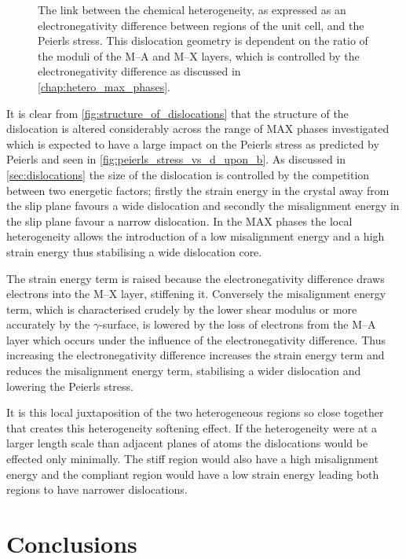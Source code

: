 \begin{figure}
\caption[The link between the structure of dislocations and local heterogeneity.]{The link between the chemical heterogeneity, as expressed as an electronegativity difference between regions of the unit cell, and the Peierls stress. This dislocation geometry is dependent on the ratio of the moduli of the M--A and M--X layers, which is controlled by the electronegativity difference as discussed in \autoref{chap:hetero_max_phases}. \label{fig:structure_of_dislocations}}
\end{figure}


It is clear from \autoref{fig:structure_of_dislocations} that the structure of the dislocation is altered considerably across the range of MAX phases investigated which is expected to have a large impact on the Peierls stress as predicted by Peierls and seen in \autoref{fig:peierls_stress_vs_d_upon_b}. As discussed in \autoref{sec:dislocations} the size of the dislocation is controlled by the competition between two energetic factors; firstly the strain energy in the crystal away from the slip plane favours a wide dislocation and secondly the misalignment energy in the slip plane favour a narrow dislocation. In the MAX phases the local heterogeneity allows the introduction of a low misalignment energy and a high strain energy thus stabilising a wide dislocation core.

The strain energy term is raised because the electronegativity difference draws electrons into the M--X layer, stiffening it. Conversely the misalignment energy term, which is characterised crudely by the lower shear modulus or more accurately by the $\gamma$-surface, is lowered by the loss of electrons from the M--A layer which occurs under the influence of the electronegativity difference. Thus increasing the electronegativity difference increases the strain energy term and reduces the misalignment energy term, stabilising a wider dislocation and lowering the Peierls stress.

It is this local juxtaposition of the two heterogeneous regions so close together that creates this heterogeneity softening effect. If the heterogeneity were at a larger length scale than adjacent planes of atoms the dislocations would be effected only minimally. The stiff region would also have a high misalignment energy and the compliant region would have a low strain energy leading both regions to have narrower dislocations.





\section{Conclusions}

